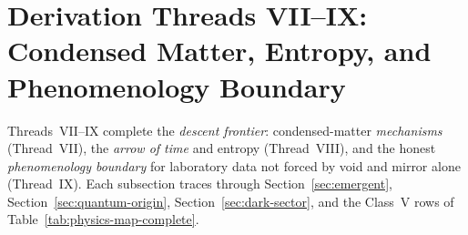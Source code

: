 \section{Derivation Threads VII--IX: Condensed Matter, Entropy, and
Phenomenology Boundary}
\label{sec:threads-7-9}

Threads~VII--IX complete the \emph{descent frontier}: condensed-matter
\emph{mechanisms} (Thread~VII), the \emph{arrow of time} and entropy
(Thread~VIII), and the honest \emph{phenomenology boundary} for laboratory
data not forced by void and mirror alone (Thread~IX). Each subsection traces
through Section~\ref{sec:emergent}, Section~\ref{sec:quantum-origin},
Section~\ref{sec:dark-sector}, and the Class~V rows of
Table~\ref{tab:physics-map-complete}.